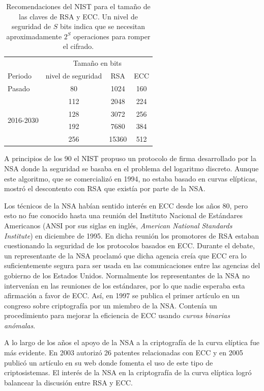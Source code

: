 \documentclass[
  a4paper,
  12pt,
  spanish,
]{scrartcl}
\begin{document}
\begin{table}[h]
  \centering
  \sffamily
  \begin{tabular}{lccc}
    \toprule
     & \multicolumn{3}{c}{Tamaño en bits} \\
    Periodo & nivel de seguridad & RSA & ECC \\
    \midrule
    Pasado & 80 & 1024 & 160\\
    \multirow[t]{4}{*}{2016-2030} & 112 & 2048 & 224\\
     & 128 & 3072 & 256\\
     & 192 & 7680 & 384\\
     & 256 & 15360 & 512\\
    \bottomrule
  \end{tabular}
  \caption{Recomendaciones del NIST para el tamaño de las claves de RSA y ECC. Un nivel de seguridad de \(S\) bits indica que se necesitan aproximadamente \(2^S\) operaciones para romper el cifrado.}
  \label{tab:rsa-ecc-nist}
\end{table}

A principios de los 90 el NIST propuso un protocolo de firma desarrollado por la NSA donde la seguridad se basaba en el problema del logaritmo discreto. Aunque este algoritmo, que se comercializó en 1994, no estaba basado en curvas elípticas, mostró el descontento con RSA que existía por parte de la NSA.

Los técnicos de la NSA habían sentido interés en ECC desde los años 80, pero esto no fue conocido hasta una reunión del Instituto Nacional de Estándares Americanos (ANSI por sus siglas en inglés, \textit{American National Standards Institute}) en diciembre de 1995. En dicha reunión los promotores de RSA estaban cuestionando la seguridad de los protocolos basados en ECC. Durante el debate, un representante de la NSA proclamó que dicha agencia creía que ECC era lo suficientemente segura para ser usada en las comunicaciones entre las agencias del gobierno de los Estados Unidos. Normalmente los representantes de la NSA no intervenían en las reuniones de los estándares, por lo que nadie esperaba esta afirmación a favor de ECC. Así, en 1997 se publica el primer artículo en un congreso sobre criptografía por un miembro de la NSA. Contenía un procedimiento para mejorar la eficiencia de ECC usando \textit{curvas binarias anómalas}.

A lo largo de los años el apoyo de la NSA a la criptografía de la curva elíptica fue más evidente. En 2003 autorizó 26 patentes relacionadas con ECC y en 2005 publicó un artículo en su web donde fomenta el uso de este tipo de criptosistemas. El interés de la NSA en la criptografía de la curva elíptica logró balancear la discusión entre RSA y ECC.
\end{document}
